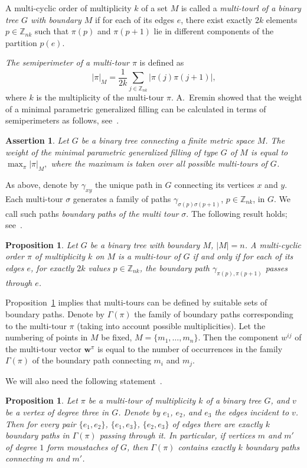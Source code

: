 \documentclass[10pt]{article}
\theoremstyle{plain}
\newtheorem{prop}[thm]{Proposition}
\newtheorem{ass}[thm]{Assertion}
\theoremstyle{definition}
\def\bw{\boldsymbol{w}}
\def\g{\gamma}
\newcommand{\Z}{{\mathbb Z}}
\begin{document}
A multi-cyclic order of multiplicity $k$ of a set $M$ is called a \emph{multi-tourl of a binary tree $G$ with boundary $M$} if for each of its edges $e$, there exist exactly $2k$ elements $p\in\Z_{nk}$ such that $\pi(p)$ and $\pi(p+1)$ lie in different components of the partition $p(e)$.

\emph{The semiperimeter of a multi-tour $\pi$} is defined as
$$
|\pi|_M=\frac1{2k}\sum_{j\in\Z_{nk}}\big|\pi(j)\pi(j+1)\big|,
$$
where $k$ is the multiplicity of the multi-tour $\pi$. A.~Eremin showed that the weight of a minimal parametric generalized filling can be calculated in terms of semiperimeters as follows, see~\cite[Theorem~4.1]{Eremin}.

\begin{ass}\label{ass:Eremin}
Let $G$ be a binary tree connecting a finite metric space $M$. The weight of the minimal parametric generalized filling of type $G$ of $M$ is equal to
$
\max_\pi|\pi|_M,
$
where the maximum is taken over all possible multi-tours of $G$.
\end{ass}

As above, denote by $\g_{xy}$ the unique path in $G$ connecting its vertices $x$ and $y$. Each multi-tour $\sigma$ generates a family of paths $\g_{\sigma(p)\sigma(p+1)}$, $p\in\Z_{nk}$, in $G$. We call such paths \emph{boundary paths of the multi tour $\sigma$}. The following result holds; see~\cite[Proposition 2.4]{Eremin}.

\begin{prop}\label{prop:mult_tour_edges}
Let $G$ be a binary tree with boundary $M$, $|M|=n$. A multi-cyclic order $\pi$ of multiplicity $k$ on $M$ is a multi-tour of $G$ if and only if for each of its edges $e$, for exactly $2k$ values $p\in\Z_{nk}$, the boundary path $\g_{\pi(p),\pi(p+1)}$ passes through $e$.
\end{prop}

Proposition~\ref{prop:mult_tour_edges} implies that multi-tours can be defined by suitable sets of boundary paths. Denote by $\Gamma(\pi)$ the family of boundary paths corresponding to the multi-tour $\pi$ (taking into account possible multiplicities). Let the numbering of points in $M$ be fixed, $M=\{m_1,\ldots,m_n\}$. Then the component $w^{ij}$ of the multi-tour vector $\bw^\pi$ is equal to the number of occurrences in the family $\Gamma(\pi)$ of the boundary path connecting $m_i$ and $m_j$.

We will also need the following statement~\cite[Proposition~2.5]{Eremin}.

\begin{prop}\label{prop:mult_tour_edges_pairs}
Let $\pi$ be a multi-tour of multiplicity $k$ of a binary tree $G$, and $v$ be a vertex of degree three in $G$. Denote by $e_1$, $e_2$, and $e_3$ the edges incident to $v$. Then for every pair $\{e_1,e_2\}$, $\{e_1,e_3\}$, $\{e_2,e_3\}$ of edges there are exactly $k$ boundary paths in $\Gamma(\pi)$ passing through it. In particular, if vertices $m$ and $m'$ of degree $1$ form moustaches of $G$, then $\Gamma(\pi)$ contains exactly $k$ boundary paths connecting $m$ and $m'$.
\end{prop}
\end{document}
